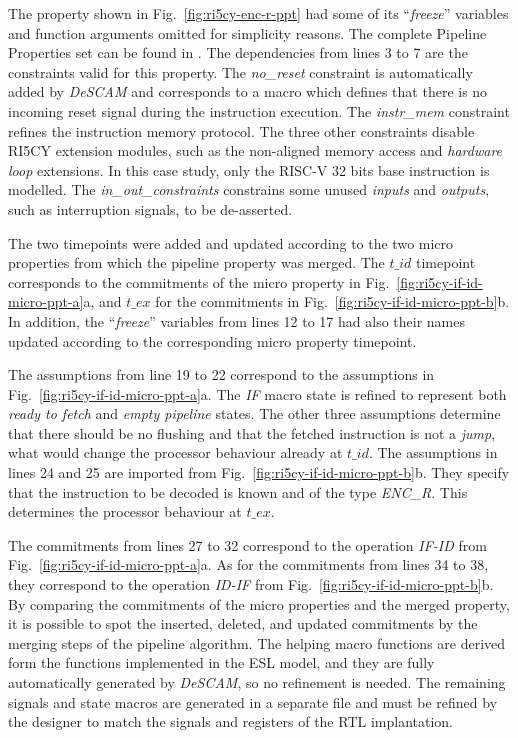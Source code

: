 The property shown in Fig.~\ref{fig:ri5cy-enc-r-ppt} had some of its “\textit{freeze}” variables and function arguments omitted for simplicity reasons. The complete Pipeline Properties set can be found in \cite{descam}. The dependencies from lines 3 to 7 are the constraints valid for this property. The \textit{no\_reset} constraint is automatically added by \textit{DeSCAM} and corresponds to a macro which defines that there is no incoming reset signal during the instruction execution. The \textit{instr\_mem} constraint refines the instruction memory protocol. The three other constraints disable RI5CY extension modules, such as the non-aligned memory access and \textit{hardware loop} extensions. In this case study, only the RISC-V 32 bits base instruction is modelled. The \textit{in\_out\_constraints} constrains some unused \textit{inputs} and \textit{outputs}, such as interruption signals, to be de-asserted. 

The two timepoints were added and updated according to the two micro properties from which the pipeline property was merged. The $t\_id$ timepoint corresponds to the commitments of the micro property in Fig.~\ref{fig:ri5cy-if-id-micro-ppt-a}a, and $t\_ex$ for the commitments in Fig.~\ref{fig:ri5cy-if-id-micro-ppt-b}b. In addition, the “\textit{freeze}” variables from lines 12 to 17 had also their names updated according to the corresponding micro property timepoint.

The assumptions from line 19 to 22 correspond to the assumptions in Fig.~\ref{fig:ri5cy-if-id-micro-ppt-a}a. The \textit{IF} macro state is refined to represent both \textit{ready to fetch} and \textit{empty pipeline} states. The other three assumptions determine that there should be no flushing and that the fetched instruction is not a \textit{jump}, what would change the processor behaviour already at $t\_id$. The assumptions in lines 24 and 25 are imported from Fig.~\ref{fig:ri5cy-if-id-micro-ppt-b}b. They specify that the instruction to be decoded is known and of the type \textit{ENC\_R}. This determines the processor behaviour at $t\_ex$.

The commitments from lines 27 to 32 correspond to the operation \textit{IF-ID} from Fig.~\ref{fig:ri5cy-if-id-micro-ppt-a}a. As for the commitments from lines 34 to 38, they correspond to the operation \textit{ID-IF} from Fig.~\ref{fig:ri5cy-if-id-micro-ppt-b}b. By comparing the commitments of the micro properties and the merged property, it is possible to spot the inserted, deleted, and updated commitments by the merging steps of the pipeline algorithm. The helping macro functions are derived form the functions implemented in the ESL model, and they are fully automatically generated by \textit{DeSCAM}, so no refinement is needed. The remaining signals and state macros are generated in a separate file and must be refined by the designer to match the signals and registers of the RTL implantation. 

